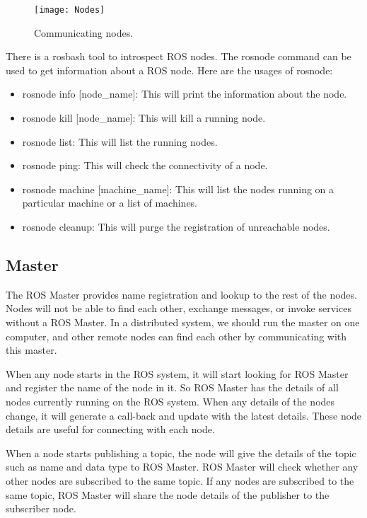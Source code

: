  	\begin{figure}[h]		
 		\centering
 		\texttt{[image: Nodes]}
 		\caption{Communicating nodes.}
 		\label{Fig:Node}
 	\end{figure}
 
	There is a rosbash tool to introspect ROS nodes.
	The rosnode command can be used to get information about a ROS node. Here are the usages of rosnode:
	\begin{itemize}
		\item rosnode info [node\_name]: This will print the information about the node.
		\item rosnode kill [node\_name]: This will kill a running node.
		\item rosnode list: This will list the running nodes.
		\item rosnode ping: This will check the connectivity of a node.
		\item rosnode machine [machine\_name]: This will list the nodes running on a particular machine or a list of machines.
		\item rosnode cleanup: This will purge the registration of unreachable nodes.
	\end{itemize}
	 
	 \subsection{Master}
	 The ROS Master provides name registration and lookup to the rest of the nodes. Nodes will not be able to find each other, exchange messages, or invoke services without a ROS Master. In a distributed system, we should run the master on one computer, and other remote nodes can find each other by communicating with this master.
	 
	 When any node starts in the ROS system, it will start looking for ROS Master and register the name of the node in it. So ROS Master has the details of all nodes currently running on the ROS system. When any details of the nodes change, it will generate a call-back and update with the latest details. These node details are useful for connecting with each node.
	 
	 When a node starts publishing a topic, the node will give the details of the topic such as name and data type to ROS Master. ROS Master will check whether any other nodes are subscribed to the same topic. If any nodes are subscribed to the same topic, ROS Master will share the node details of the publisher to the subscriber node.
	 
